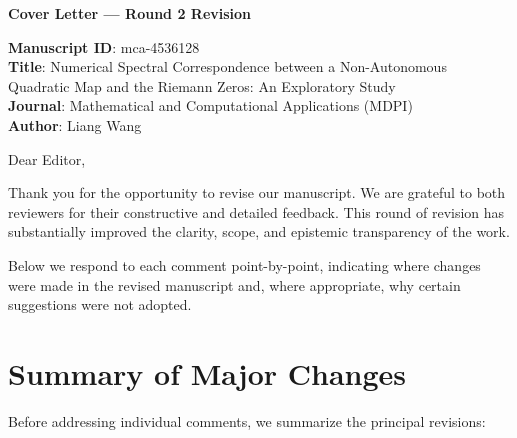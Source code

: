 \documentclass[11pt]{article}
\begin{document}
\begin{center}
\textbf{\Large Cover Letter --- Round 2 Revision}
\end{center}

\vspace{0.3cm}

\noindent \textbf{Manuscript ID}: mca-4536128\\
\textbf{Title}: Numerical Spectral Correspondence between a Non-Autonomous Quadratic Map and the Riemann Zeros: An Exploratory Study\\
\textbf{Journal}: Mathematical and Computational Applications (MDPI)\\
\textbf{Author}: Liang Wang

\vspace{0.5cm}

\noindent Dear Editor,

Thank you for the opportunity to revise our manuscript. We are grateful to both reviewers for their constructive and detailed feedback. This round of revision has substantially improved the clarity, scope, and epistemic transparency of the work.

Below we respond to each comment point-by-point, indicating where changes were made in the revised manuscript and, where appropriate, why certain suggestions were not adopted.

\section*{Summary of Major Changes}

Before addressing individual comments, we summarize the principal revisions:
\end{document}

